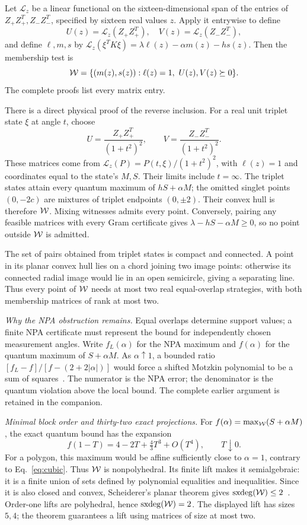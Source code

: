 \documentclass[11pt,twocolumn]{article}
\newcommand{\sxdeg}{\operatorname{sxdeg}}
\begin{document}
Let $\mathcal L_z$ be a linear functional on the sixteen-dimensional
span of the entries of $Z_+Z_+^T,Z_-Z_-^T$, specified by sixteen real
values $z$. Apply it entrywise to define
\[
 U(z)=\mathcal L_z(Z_+Z_+^T),\quad V(z)=\mathcal L_z(Z_-Z_-^T),
\]
and define $\ell,m,s$ by
$\mathcal L_z(\xi^TK\xi)=\lambda\ell(z)-\alpha m(z)-hs(z)$.
Then the membership test is
\begin{equation}
 \mathcal W=\{(m(z),s(z)):\ell(z)=1,\ U(z),V(z)\succeq0\}.
 \label{eq:membership}
\end{equation}
The complete proofs list every matrix entry.

There is a direct physical proof of the reverse inclusion.
For a real unit triplet state $\xi$ at angle $t$, choose
\[
 U=\frac{Z_+Z_+^T}{(1+t^2)^2},\qquad
 V=\frac{Z_-Z_-^T}{(1+t^2)^2}.
\]
These matrices come from $\mathcal L_z(P)=P(t,\xi)/(1+t^2)^2$,
with $\ell(z)=1$ and coordinates equal to the state's $M,S$. Their limits include $t=\infty$.
The triplet states attain every quantum maximum of $hS+\alpha M$; the omitted
singlet points $(0,-2c)$ are mixtures of triplet endpoints $(0,\pm2)$.
Their convex hull is therefore $\mathcal W$. Mixing witnesses admits every
point. Conversely, pairing any feasible matrices with every Gram
certificate gives $\lambda-hS-\alpha M\ge0$, so no point outside
$\mathcal W$ is admitted.

The set of pairs obtained from triplet states is compact and connected. A point in its planar convex
hull lies on a chord joining two image points: otherwise its connected
radial image would lie in an open semicircle, giving a separating line.
Thus every point of $\mathcal W$ needs at most two real equal-overlap strategies,
with both membership matrices of rank at most two.

\emph{Why the NPA obstruction remains.}
Equal overlaps determine support values; a finite NPA certificate
must represent the bound for independently chosen measurement angles.
Write $f_L(\alpha)$ for the NPA maximum and $f(\alpha)$ for the quantum
maximum of $S+\alpha M$. As $\alpha\uparrow1$, a bounded ratio
$[f_L-f]/[f-(2+2|\alpha|)]$ would force a shifted Motzkin polynomial
to be a sum of squares~\cite{prior}. The numerator is the NPA error;
the denominator is the quantum violation above the local bound.
The complete earlier argument is retained in the companion.

\emph{Minimal block order and thirty-two exact projections.}
For $f(\alpha)=\max_\mathcal W(S+\alpha M)$, the exact quantum bound has
the expansion~\cite{prior}
\begin{equation}
 f(1-T)=4-2T+\tfrac43T^3+O(T^4),\qquad T\downarrow0 .
 \label{eq:cubic}
\end{equation}
For a polygon, this maximum would be affine sufficiently close to $\alpha=1$,
contrary to Eq.~\eqref{eq:cubic}. Thus $\mathcal W$ is nonpolyhedral.
Its finite lift makes it semialgebraic: it is a finite union of sets
defined by polynomial equalities and inequalities. Since it is also
closed and convex, Scheiderer's planar theorem gives $\sxdeg(\W)\leq2$~\cite{soc}.
Order-one lifts are polyhedral, hence $\sxdeg(\W)=2$.
The displayed lift has sizes $5,4$; the theorem guarantees a lift
using matrices of size at most two.
\end{document}
